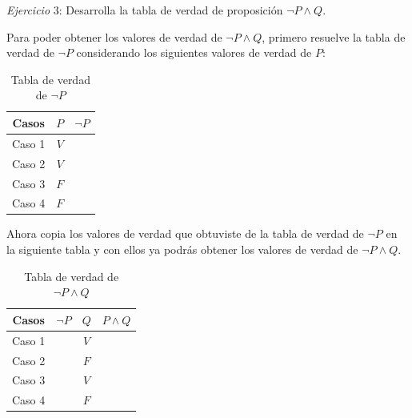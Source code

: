 \documentclass[letterpaper, twoside]{article}
\begin{document}
\vspace{1cm}

\newpage

\textit{Ejercicio} 3: Desarrolla la tabla de verdad de proposición $\lnot P\land Q$.\par
Para poder obtener los valores de verdad de $\lnot P\land Q$, primero resuelve la tabla de verdad de $\lnot P$ considerando los siguientes valores de verdad de $P$:

\vspace{.5cm}

\begin{table}[h]
  \centering
  \begin{tabular}{|c|c|c|}
    \hline
    Casos  & $P$ & $\lnot P$ \\ \hline
    Caso 1 & $V$ &  \\ \hline
    Caso 2 & $V$ &  \\ \hline
    Caso 3 & $F$ &  \\ \hline
    Caso 4 & $F$ &  \\ \hline 
  \end{tabular}
  \caption*{Tabla de verdad de $\lnot P$}
\end{table}

\vspace{.5cm}

Ahora copia los valores de verdad que obtuviste de la tabla de verdad de $\lnot P$ en la siguiente tabla y con ellos ya podrás obtener los valores de verdad de $\lnot P\land Q$.

\begin{table}[h]
  \centering
  \begin{tabular}{|c|c|c|c|}
    \hline
    Casos  & $\lnot P$ & $Q$ & $P\land Q$ \\ \hline
    Caso 1 & & $V$ &  \\ \hline
    Caso 2 & & $F$ &  \\ \hline
    Caso 3 & & $V$ &  \\ \hline
    Caso 4 & & $F$ &  \\ \hline 
  \end{tabular}
  \caption*{Tabla de verdad de $\lnot P\land Q$}
\end{table}
\end{document}
